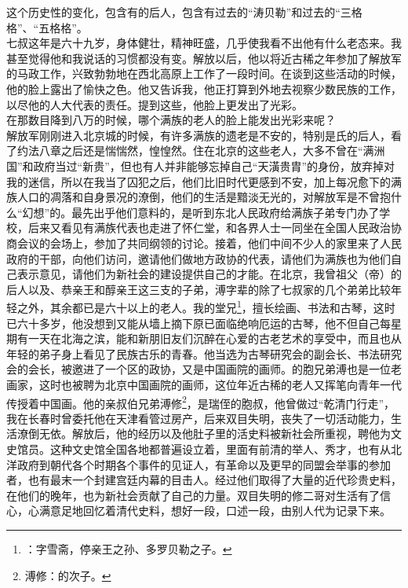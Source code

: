 这个历史性的变化，包含有的后人，包含有过去的“涛贝勒”和过去的“三格格”、“五格格”。\\

七叔这年是六十九岁，身体健壮，精神旺盛，几乎使我看不出他有什么老态来。我甚至觉得他和我说话的习惯都没有变。解放以后，他以将近古稀之年参加了解放军的马政工作，兴致勃勃地在西北高原上工作了一段时间。在谈到这些活动的时候，他的脸上露出了愉快之色。他又告诉我，他正打算到外地去视察少数民族的工作，以尽他的人大代表的责任。提到这些，他脸上更发出了光彩。\\

在那数目降到八万的时候，哪个满族的老人的脸上能发出光彩来呢？\\

解放军刚刚进入北京城的时候，有许多满族的遗老是不安的，特别是氏的后人，看了约法八章之后还是惴惴然，惶惶然。住在北京的这些老人，大多不曾在“满洲国”和政府当过“新贵”，但也有人并非能够忘掉自己“天潢贵胄”的身份，放弃掉对我的迷信，所以在我当了囚犯之后，他们比旧时代更感到不安，加上每况愈下的满族人口的凋落和自身景况的潦倒，他们的生活是黯淡无光的，对解放军是不曾抱什么“幻想”的。最先出乎他们意料的，是听到东北人民政府给满族子弟专门办了学校，后来又看见有满族代表也走进了怀仁堂，和各界人士一同坐在全国人民政治协商会议的会场上，参加了共同纲领的讨论。接着，他们中间不少人的家里来了人民政府的干部，向他们访问，邀请他们做地方政协的代表，请他们为满族也为他们自己表示意见，请他们为新社会的建设提供自己的才能。在北京，我曾祖父（帝）的后人以及、恭亲王和醇亲王这三支的子弟，溥字辈的除了七叔家的几个弟弟比较年轻之外，其余都已是六十以上的老人。我的堂兄\footnote{：字雪斋，停亲王之孙、多罗贝勒之子。}，擅长绘画、书法和古琴，这时已六十多岁，他没想到又能从墙上摘下原已面临绝响厄运的古琴，他不但自己每星期有一天在北海之滨，能和新朋旧友们沉醉在心爱的古老艺术的享受中，而且也从年轻的弟子身上看见了民族古乐的青春。他当选为古琴研究会的副会长、书法研究会的会长，被邀进了一个区的政协，又是中国画院的画师。的胞兄弟溥也是一位老画家，这时也被聘为北京中国画院的画师，这位年近古稀的老人又挥笔向青年一代传授着中国画。他的亲叔伯兄弟溥修\footnote{溥修：的次子。}，是瑞侄的胞叔，他曾做过“乾清门行走”，我在长春时曾委托他在天津看管过房产，后来双目失明，丧失了一切活动能力，生活潦倒无依。解放后，他的经历以及他肚子里的活史料被新社会所重视，聘他为文史馆员。这种文史馆全国各地都普遍设立着，里面有前清的举人、秀才，也有从北洋政府到朝代各个时期各个事件的见证人，有革命以及更早的同盟会举事的参加者，也有最末一个封建宫廷内幕的目击人。经过他们取得了大量的近代珍贵史料，在他们的晚年，也为新社会贡献了自己的力量。双目失明的修二哥对生活有了信心，心满意足地回忆着清代史料，想好一段，口述一段，由别人代为记录下来。\\

